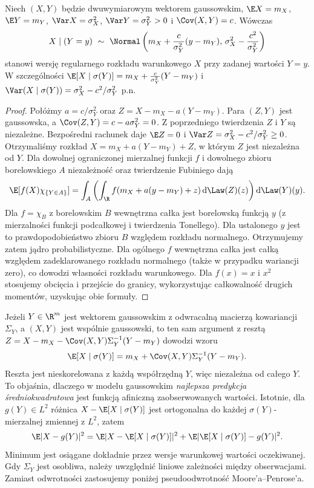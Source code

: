 \begin{twierdzenie}
Niech $(X,Y)$ będzie dwuwymiarowym wektorem gaussowskim,
$\E X=m_X$, $\E Y=m_Y$, $\Var X=\sigma_X^2$,
$\Var Y=\sigma_Y^2>0$ i $\Cov(X,Y)=c$.
Wówczas
\[
X\mid(Y=y)\ \sim\ \Normal\left(
 m_X+\frac{c}{\sigma_Y^2}(y-m_Y),\,
 \sigma_X^2-\frac{c^2}{\sigma_Y^2}\right)
\]
stanowi wersję regularnego rozkładu warunkowego $X$ przy zadanej
wartości $Y=y$. W szczególności
$\E[X\mid\sigma(Y)]=m_X+\frac{c}{\sigma_Y^2}(Y-m_Y)$
i $\Var(X\mid\sigma(Y))=\sigma_X^2-c^2/\sigma_Y^2$ p.n.
\end{twierdzenie}
\begin{proof}
Połóżmy $a=c/\sigma_Y^2$ oraz
$Z=X-m_X-a(Y-m_Y)$. Para $(Z,Y)$ jest gaussowska,
a $\Cov(Z,Y)=c-a\sigma_Y^2=0$.
Z poprzedniego twierdzenia $Z$ i $Y$ są niezależne.
Bezpośredni rachunek daje $\E Z=0$ i
$\Var Z=\sigma_X^2-c^2/\sigma_Y^2\ge0$.
Otrzymaliśmy rozkład $X=m_X+a(Y-m_Y)+Z$,
w którym $Z$ jest niezależna od $Y$.
Dla dowolnej ograniczonej mierzalnej funkcji $f$ i dowolnego
zbioru borelowskiego $A$ niezależność oraz twierdzenie Fubiniego
dają
\[
\E[f(X)\chi_{\{Y\in A\}}]
=\int_A\left(\int_\R f(m_X+a(y-m_Y)+z)\,\mathrm d\Law(Z)(z)\right)
\mathrm d\Law(Y)(y).
\]
Dla $f=\chi_B$ z borelowskim $B$ wewnętrzna całka
jest borelowską funkcją $y$ (z mierzalności funkcji
podcałkowej i twierdzenia Tonellego). Dla ustalonego $y$
jest to prawdopodobieństwo zbioru $B$ względem rozkładu
normalnego. Otrzymujemy zatem jądro probabilistyczne.
Dla ogólnego $f$ wewnętrzna całka jest całką względem
zadeklarowanego rozkładu normalnego (także w przypadku wariancji zero), co dowodzi
własności rozkładu warunkowego. Dla $f(x)=x$ i $x^2$
stosujemy obcięcia i przejście do granicy, wykorzystując
całkowalność drugich momentów, uzyskując obie formuły.
\end{proof}

\begin{uwaga}
Jeżeli $Y\in\R^m$ jest wektorem gaussowskim z odwracalną macierzą
kowariancji $\Sigma_Y$, a $(X,Y)$ jest wspólnie gaussowski,
to ten sam argument z resztą
$Z=X-m_X-\Cov(X,Y)\Sigma_Y^{-1}(Y-m_Y)$ dowodzi wzoru
\[
\E[X\mid\sigma(Y)]
=m_X+\Cov(X,Y)\Sigma_Y^{-1}(Y-m_Y).
\]
Reszta jest nieskorelowana z każdą współrzędną $Y$,
więc niezależna od całego $Y$. To objaśnia, dlaczego
w modelu gaussowskim \emph{najlepsza predykcja średniokwadratowa}
jest funkcją afiniczną zaobserwowanych wartości. Istotnie,
dla $g(Y)\in L^2$ różnica $X-\E[X\mid\sigma(Y)]$
jest ortogonalna do każdej $\sigma(Y)$-mierzalnej
zmiennej z $L^2$, zatem
\[
\E|X-g(Y)|^2=\E|X-\E[X\mid\sigma(Y)]|^2
+\E|\E[X\mid\sigma(Y)]-g(Y)|^2.
\]
Minimum jest osiągane dokładnie przez wersje warunkowej
wartości oczekiwanej.
Gdy $\Sigma_Y$ jest osobliwa, należy uwzględnić liniowe
zależności między obserwacjami. Zamiast odwrotności
zastosujemy poniżej pseudoodwrotność Moore'a--Penrose'a.
\end{uwaga}

